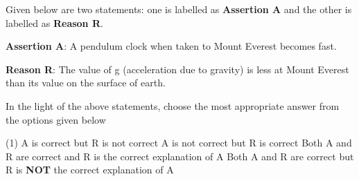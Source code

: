 \item Given below are two statements: one is labelled as \textbf{Assertion A} and the other is labelled as \textbf{Reason R}.

\textbf{Assertion A}: A pendulum clock when taken to Mount Everest becomes fast.

\textbf{Reason R}: The value of g (acceleration due to gravity) is less at Mount Everest than its value on the surface of earth.

In the light of the above statements, choose the most appropriate answer from the options given below

\begin{tasks}(1)
    \task A is correct but R is not correct
    \task A is not correct but R is correct
    \task Both A and R are correct and R is the correct explanation of A
    \task Both A and R are correct but R is \textbf{NOT} the correct explanation of A
\end{tasks}